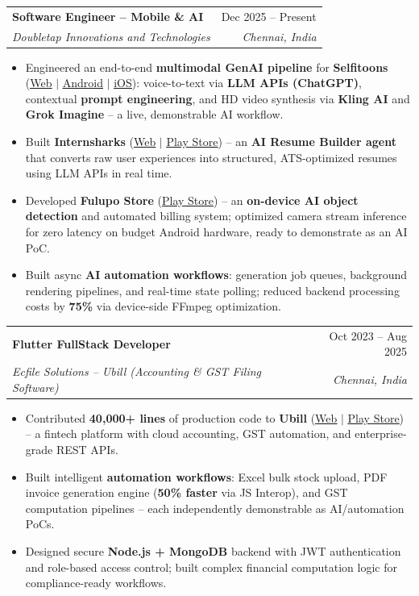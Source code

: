 \documentclass[letterpaper,10pt]{article}
\makeatletter
\newcommand{\resumeItem}[1]{\item\small{{#1 \vspace{-2pt}}}}
\newcommand{\resumeSubheading}[4]{
  \vspace{-2pt}\item
    \begin{tabular*}{0.97\textwidth}[t]{l@{\extracolsep{\fill}}r}
      \textbf{#1} & #2 \\
      \textit{\small#3} & \textit{\small #4} \\
    \end{tabular*}\vspace{-7pt}
}
\newcommand{\resumeItemListStart}{\begin{itemize}}
\newcommand{\resumeItemListEnd}{\end{itemize}\vspace{-5pt}}
\makeatother
\begin{document}
    \resumeSubheading
      {Software Engineer -- Mobile \& AI}{Dec 2025 -- Present}
      {Doubletap Innovations and Technologies}{Chennai, India}
      \resumeItemListStart
        \resumeItem{Engineered an end-to-end \textbf{multimodal GenAI pipeline} for \textbf{Selfitoons} (\href{https://selfitoons.ai/}{\underline{Web}} $|$ \href{https://play.google.com/store/apps/details?id=com.doubletap.ai.selfitoons}{\underline{Android}} $|$ \href{https://apps.apple.com/in/app/selfitoons/id6758597947}{\underline{iOS}}): voice-to-text via \textbf{LLM APIs (ChatGPT)}, contextual \textbf{prompt engineering}, and HD video synthesis via \textbf{Kling AI} and \textbf{Grok Imagine} -- a live, demonstrable AI workflow.}
        \resumeItem{Built \textbf{Internsharks} (\href{https://internsharks.ai/}{\underline{Web}} $|$ \href{https://play.google.com/store/apps/details?id=com.doubletap.internsharks.ai}{\underline{Play Store}}) -- an \textbf{AI Resume Builder agent} that converts raw user experiences into structured, ATS-optimized resumes using LLM APIs in real time.}
        \resumeItem{Developed \textbf{Fulupo Store} (\href{https://play.google.com/store/apps/details?id=com.doubletap.fulupostore}{\underline{Play Store}}) -- an \textbf{on-device AI object detection} and automated billing system; optimized camera stream inference for zero latency on budget Android hardware, ready to demonstrate as an AI PoC.}
        \resumeItem{Built async \textbf{AI automation workflows}: generation job queues, background rendering pipelines, and real-time state polling; reduced backend processing costs by \textbf{75\%} via device-side FFmpeg optimization.}
      \resumeItemListEnd

    \resumeSubheading
      {Flutter FullStack Developer}{Oct 2023 -- Aug 2025}
      {Ecfile Solutions -- Ubill (Accounting \& GST Filing Software)}{Chennai, India}
      \resumeItemListStart
        \resumeItem{Contributed \textbf{40,000+ lines} of production code to \textbf{Ubill} (\href{https://app.ubill.tech/}{\underline{Web}} $|$ \href{https://play.google.com/store/apps/details?id=com.ubill.tech}{\underline{Play Store}}) -- a fintech platform with cloud accounting, GST automation, and enterprise-grade REST APIs.}
        \resumeItem{Built intelligent \textbf{automation workflows}: Excel bulk stock upload, PDF invoice generation engine (\textbf{50\% faster} via JS Interop), and GST computation pipelines -- each independently demonstrable as AI/automation PoCs.}
        \resumeItem{Designed secure \textbf{Node.js + MongoDB} backend with JWT authentication and role-based access control; built complex financial computation logic for compliance-ready workflows.}
      \resumeItemListEnd
\end{document}

